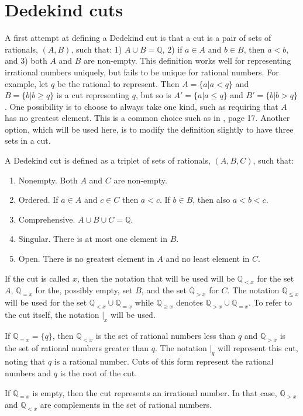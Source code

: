 \documentclass{rmj-public}
\newcommand{\qcut}[2][x]{\ensuremath{\mathbb{Q}_{#2 #1}}}
\newcommand{\qlt}[1][x]{\qcut[#1]{<}}
\newcommand{\qeq}[1][x]{\qcut[#1]{=}}
\newcommand{\qgt}[1][x]{\qcut[#1]{>}}
\newcommand{\qgeq}[1][x]{\qcut[#1]{\geq}}
\newcommand{\qleq}[1][x]{\qcut[#1]{\leq}}
\newcommand{\cut}[1][x]{{\vert}_{#1} }
\begin{document}
\section{Dedekind cuts}

A first attempt at defining a Dedekind cut is that a cut is a pair of sets of rationals, $(A, B)$, such that: 1) $A \cup B = \mathbb{Q}$, 2) if $a \in A$ and $b \in B$, then $a < b$, and 3) both $A$ and $B$ are non-empty. This definition works well for representing irrational numbers uniquely, but fails to be unique for rational numbers. For example, let $q$ be the rational to represent. Then $A = \{a | a < q\}$ and $B= \{b | b \geq q\}$ is a cut representing $q$, but so is  $A' = \{a | a \leq q\}$ and $B'= \{b | b > q\}$. One possibility is to choose to always take one kind, such as requiring that $A$ has no greatest element. This is a common choice such as in \cite{rudin}, page 17. Another option, which will be used here, is to modify the definition slightly to have three sets in a cut.

A Dedekind cut is defined as a triplet of sets of rationals, $(A, B, C)$, such that: 
\begin{enumerate}
    \item Nonempty. Both $A$ and $C$ are non-empty.
    \item Ordered. If $a \in A$ and $c \in C$ then $a < c$. If $b \in B$, then also $a < b < c$. 
    \item Comprehensive. $A \cup B \cup C = \mathbb{Q}$.
    \item Singular. There is at most one element in $B$.
    \item Open. There is no greatest element in $A$ and no least element in $C$.
\end{enumerate}
If the cut is called $x$, then the notation that will be used will be $\qlt$ for the set $A$, $\qeq$ for the, possibly empty, set $B$, and the set $\qgt$ for $C$. The notation $\qleq$ will be used for the set $\qlt \cup \qeq$ while $\qgeq$ denotes $\qgt \cup \qeq$. To refer to the cut itself, the notation $\cut$ will be used. 



If $\qeq = \{q\}$, then $\qlt$ is the set of rational numbers less than $q$ and $\qgt$ is the set of rational numbers greater than $q$. The notation $\cut[q]$ will represent this cut, noting that $q$ is a rational number. Cuts of this form represent the rational numbers and $q$ is the root of the cut. 

If $\qeq$ is empty, then the cut represents an irrational number. In that case, $\qgt$ and $\qlt$ are complements in the set of rational numbers. 
\end{document}
